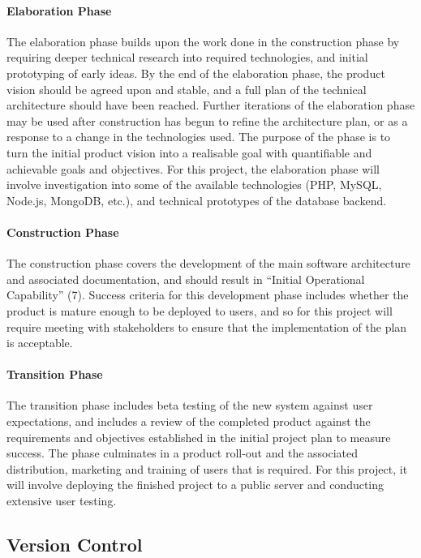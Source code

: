 \documentclass[12pt,a4paper]{article}
\begin{document}
\paragraph{Elaboration Phase} The elaboration phase builds upon the work done in
the construction phase by requiring deeper technical research into required
technologies, and initial prototyping of early ideas. By the end of the
elaboration phase, the product vision should be agreed upon and stable, and a
full plan of the technical architecture should have been reached.  Further
iterations of the elaboration phase may be used after construction has begun to
refine the architecture plan, or as a response to a change in the technologies
used. The purpose of the phase is to turn the initial product vision into a
realisable goal with quantifiable and achievable goals and objectives. For this
project, the elaboration phase will involve investigation into some of the
available technologies (PHP, MySQL, Node.js, MongoDB, etc.), and technical
prototypes of the database backend.

\paragraph{Construction Phase} The construction phase covers the development of
the main software architecture and associated documentation, and should result
in ``Initial Operational Capability'' (7). Success criteria for this development
phase includes whether the product is mature enough to be deployed to users, and
so for this project will require meeting with stakeholders to ensure that the
implementation of the plan is acceptable.

\paragraph{Transition Phase} The transition phase includes beta testing of the
new system against user expectations, and includes a review of the completed
product against the requirements and objectives established in the initial
project plan to measure success. The phase culminates in a product roll-out and
the associated distribution, marketing and training of users that is
required. For this project, it will involve deploying the finished project to a
public server and conducting extensive user testing.

\subsection{Version Control}
\end{document}
